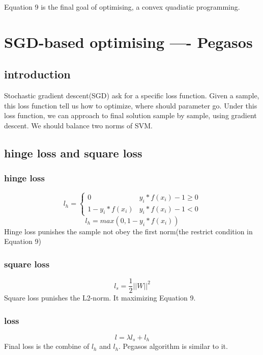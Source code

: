 \documentclass[11pt]{article}
\begin{document}
Equation 9 is the final goal of optimising, a convex quadiatic programming.

\section{SGD-based optimising ---- Pegasos}
\subsection{introduction}
Stochastic gradient descent(SGD) ask for a specific loss function. Given a sample, this loss function tell us how to optimize, where should parameter go. Under this loss function, we can approach to final solution sample by sample, using gradient descent. We should balance two norms of SVM.
\subsection{hinge loss and square loss}
\subsubsection{hinge loss}
\begin{equation}
l_h =
\left\{
\begin{array}{lr}
0 &         y_i * f(x_i) - 1 \geq  0      \\
1 - y_i * f(x_i) & y_i * f(x_i) - 1 < 0
\end{array}
\right.
\end{equation}
\begin{equation}
l_h = max(0, 1 - y_i * f(x_i))
\end{equation}
Hinge loss punishes the sample not obey the first norm(the restrict condition in Equation 9)

\subsubsection{square loss}
\begin{equation}
l_s = \frac{1}{2} ||W||^2
\end{equation}
Square loss punishes the L2-norm. It maximizing Equation 9.

\subsubsection{loss}
\begin{equation}
l = \lambda l_s + l_h
\end{equation}
Final loss is the combine of $l_h$ and $l_h$. Pegasos algorithm is similar to it.
\end{document}
